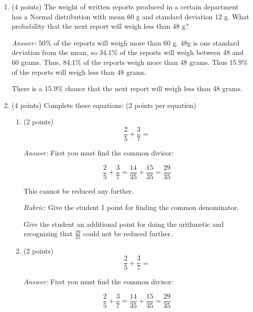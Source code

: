 \documentclass[letterpaper,12pt,addpoints]{exam}
\begin{document}
\begin{enumerate}
\item (4 points) The weight of written reports produced in a certain department has a Normal distribution with mean 60 g and standard deviation 12 g.  What probability that the next report will weigh less than 48 g?

\textit{Answer:}  50\% of the reports will weigh more than 60 g.  48g is one standard deviation from the mean, so 34.1\% of the reports will weigh between 48 and 60 grams.  Thus,  84.1\% of the reports weigh more than 48 grams.  Thus 15.9\% of the reports will weigh less than 48 grams.

There is a 15.9\% chance that the next report will weigh less than 48 grams.

\item (4 points) Complete these equations: (2 points per equation)

\begin{enumerate}
\item (2 points) 
\begin{equation*}
\frac{2}{5} + \frac{3}{7} = 
\end{equation*}

\begin{minipage}[t]{0.50\textwidth}
\textit{Answer:}  First you must find the common divisor:

$$\frac{2}{5} + \frac{3}{7} = \frac{14}{35} + \frac{15}{35} =   \frac{29}{35}$$

This cannot be reduced any further.

\end{minipage}
\hspace{0.05\textwidth}
\begin{minipage}[t]{0.40\textwidth}
\textit{Rubric:}  Give the student 1 point for finding the common denominator.  

Give the student an additional point for doing the arithmetic and recognizing that $\frac{29}{35}$ could not be reduced further.
\end{minipage}

\item (2 points)
\begin{equation*}
\frac{2}{5} + \frac{3}{7} = 
\end{equation*}

\begin{minipage}[t]{0.50\textwidth}

\textit{Answer:}  First you must find the common divisor:

$$\frac{2}{5} + \frac{3}{7} = \frac{14}{35} + \frac{15}{35} =   \frac{29}{35}$$


\end{minipage}
\end{enumerate}
\end{enumerate}
\end{document}
